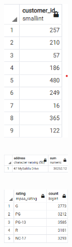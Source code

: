 \documentclass{article}
\begin{document}
\subsection{}
\begin{figure}[ht]
    \centering
    \includegraphics[width=0.3\textwidth]{figures/4-c.png}
    \caption
	{
	}
    \label{fig:fig1}
\end{figure}

\subsection{}
\begin{figure}[ht]
    \centering
    \includegraphics[width=0.3\textwidth]{figures/4-d.png}
    \caption
	{
	}
    \label{fig:fig1}
\end{figure}

\subsection{}
\begin{figure}[ht]
    \centering
    \includegraphics[width=0.3\textwidth]{figures/4-e.png}
    \caption
	{
	}
    \label{fig:fig1}
\end{figure}
\end{document}
